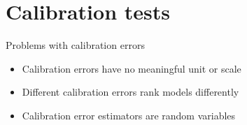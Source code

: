\documentclass[aspectratio=169,hyperref={pdfpagelabels=false,pageanchor=false,bookmarks=false}]{beamer}
\newenvironment{uuredbox}[1][]%
{\begin{tcolorbox}[colback=uured!15,colframe=uured,#1]}%
  {\end{tcolorbox}}
\begin{document}
\section{Calibration tests}
\frame{\sectionpage}

\begin{frame}{Problems with calibration errors}
  \begin{uuredbox}[halign=flush center, left=0pt]
    \begin{itemize}[<+->]
      \item Calibration errors have no meaningful unit or scale
      \item Different calibration errors rank models differently
      \item Calibration error estimators are random variables
    \end{itemize}
  \end{uuredbox}
\end{frame}
\end{document}
